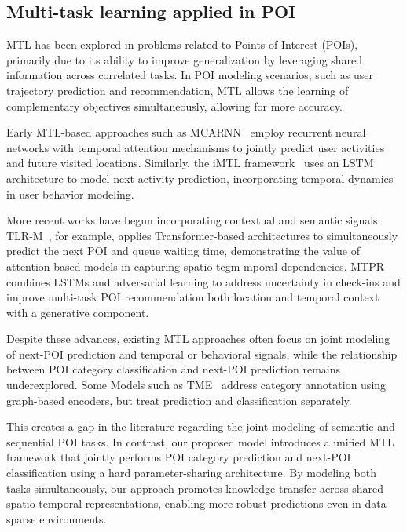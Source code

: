 \subsection{Multi-task learning applied in POI}
MTL has been explored in problems related to Points of Interest (POIs), primarily due to its ability to improve generalization by leveraging shared information across correlated tasks. In POI modeling scenarios, such as user trajectory prediction and recommendation, MTL allows the learning of complementary objectives simultaneously, allowing for more accuracy.


Early MTL-based approaches such as MCARNN~\cite{Liao2018} employ recurrent neural networks with temporal attention mechanisms to jointly predict user activities and future visited locations. Similarly, the iMTL framework~\cite{Zhang2020} uses an LSTM architecture to model next-activity prediction, incorporating temporal dynamics in user behavior modeling.

More recent works have begun incorporating contextual and semantic signals. TLR-M~\cite{Halder2021}, for example, applies Transformer-based architectures to simultaneously predict the next POI and queue waiting time, demonstrating the value of attention-based models in capturing spatio-tegm
mporal dependencies. MTPR~\cite{Xia2020} combines LSTMs and adversarial learning to address uncertainty in check-ins and improve multi-task POI recommendation both location and temporal context with a generative component.

Despite these advances, existing MTL approaches often focus on joint modeling of next-POI prediction and temporal or behavioral signals, while the relationship between POI category classification and next-POI prediction remains underexplored. Some Models such as TME~\cite{Xu2023} address category annotation using graph-based encoders, but treat prediction and classification separately.

This creates a gap in the literature regarding the joint modeling of semantic and sequential POI tasks. In contrast, our proposed model introduces a unified MTL framework that jointly performs POI category prediction and next-POI classification using a hard parameter-sharing architecture. By modeling both tasks simultaneously, our approach promotes knowledge transfer across shared spatio-temporal representations, enabling more robust predictions even in data-sparse environments.


